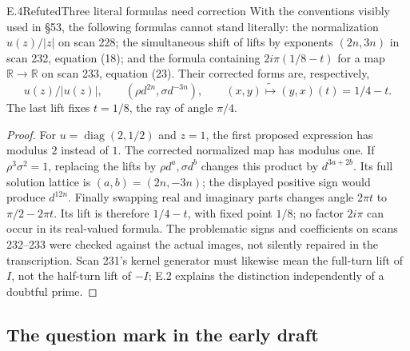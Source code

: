 \begin{statement}{E.4}{Refuted}{Three literal formulas need correction}
With the conventions visibly used in \S53, the following formulas
cannot stand literally: the normalization $u(z)/|z|$ on scan 228;
the simultaneous shift of lifts by exponents $(2n,3n)$ in scan 232,
equation (18); and the formula containing $2i\pi(1/8-t)$ for a map
$\mathbb R\to\mathbb R$ on scan 233, equation (23).
Their corrected forms are, respectively,
\[
 u(z)/|u(z)|,\qquad
 (\rho d^{2n},\sigma d^{-3n}),\qquad
 \widetilde{(x,y)\mapsto(y,x)}(t)=1/4-t.
\]
The last lift fixes $t=1/8$, the ray of angle $\pi/4$.
\end{statement}
\begin{proof}
For $u=\operatorname{diag}(2,1/2)$ and $z=1$, the first proposed
expression has modulus $2$ instead of $1$.  The corrected normalized
map has modulus one.  If $\rho^3\sigma^2=1$, replacing the lifts by
$\rho d^a,\sigma d^b$ changes this product by $d^{3a+2b}$.
Its full solution lattice is $(a,b)=(2n,-3n)$; the displayed positive
sign would produce $d^{12n}$.  Finally swapping real and imaginary
parts changes angle $2\pi t$ to $\pi/2-2\pi t$.  Its lift is therefore
$1/4-t$, with fixed point $1/8$; no factor $2i\pi$ can occur in its
real-valued formula.  The problematic signs and coefficients on
scans 232--233 were checked against the actual images, not silently
repaired in the transcription.  Scan 231's kernel generator must
likewise mean the full-turn lift of $I$, not the half-turn lift of
$-I$; E.2 explains the distinction independently of a doubtful prime.
\end{proof}

\subsection{The question mark in the early draft}

